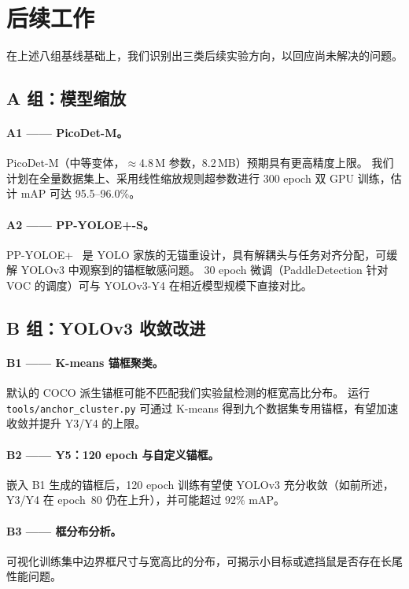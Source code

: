 \section{后续工作}
\label{sec:future}

在上述八组基线基础上，我们识别出三类后续实验方向，以回应尚未解决的问题。

\subsection{A 组：模型缩放}

\paragraph{A1 —— PicoDet-M。}
PicoDet-M（中等变体，$\approx$4.8\,M 参数，8.2\,MB）预期具有更高精度上限。
我们计划在全量数据集上、采用线性缩放规则超参数进行 300 epoch 双 GPU 训练，估计 mAP 可达 95.5--96.0\%。

\paragraph{A2 —— PP-YOLOE+-S。}
PP-YOLOE+~\citep{xu2022ppyoloe} 是 YOLO 家族的无锚重设计，具有解耦头与任务对齐分配，可缓解 YOLOv3 中观察到的锚框敏感问题。
30 epoch 微调（PaddleDetection 针对 VOC 的调度）可与 YOLOv3-Y4 在相近模型规模下直接对比。

\subsection{B 组：YOLOv3 收敛改进}

\paragraph{B1 —— K-means 锚框聚类。}
默认的 COCO 派生锚框可能不匹配我们实验鼠检测的框宽高比分布。
运行 \texttt{tools/anchor\_cluster.py} 可通过 K-means 得到九个数据集专用锚框，有望加速收敛并提升 Y3/Y4 的上限。

\paragraph{B2 —— Y5：120 epoch 与自定义锚框。}
嵌入 B1 生成的锚框后，120 epoch 训练有望使 YOLOv3 充分收敛（如前所述，Y3/Y4 在 epoch~80 仍在上升），并可能超过 92\% mAP。

\paragraph{B3 —— 框分布分析。}
可视化训练集中边界框尺寸与宽高比的分布，可揭示小目标或遮挡鼠是否存在长尾性能问题。

